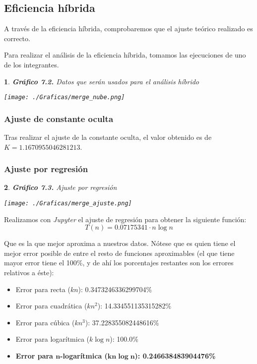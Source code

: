 \documentclass[10pt, a4paper]{article}
\theoremstyle{theorem-style}
\newtheorem*{datos}{}
\theoremstyle{theorem-style}
\theoremstyle{definition-style}
\theoremstyle{remark-style}
\theoremstyle{example-style}
\theoremstyle{definition-style}
\theoremstyle{remark-style}
\begin{document}
\subsection{Eficiencia híbrida}

A través de la eficiencia híbrida, comprobaremos que el ajuste teórico realizado es correcto.

Para realizar el análisis de la eficiencia híbrida, tomamos las ejecuciones de uno de los integrantes.
\pagebreak
\begin{datos}
	{\bf\sffamily Gráfico 7.2.} {\sffamily Datos que serán usados para el análisis híbrido}\\
	\vspace{-0.7cm}
	\begin{center}
		\texttt{[image: ./Graficas/merge\_nube.png]}
	\end{center}	
\end{datos}

\subsubsection{Ajuste de constante oculta}

Tras realizar el ajuste de la constante oculta, el valor obtenido es de $K=1.1670955046281213$.
\pagebreak
\subsubsection{Ajuste por regresión}

\begin{datos}
	{\bf\sffamily Gráfico 7.3.} {\sffamily Ajuste por regresión}\\
	\vspace{-0.7cm}
	\begin{center}
		\texttt{[image: ./Graficas/merge\_ajuste.png]}
	\end{center}	
\end{datos}

Realizamos con \emph{Jupyter} el ajuste de regresión para obtener la siguiente función:
$$T(n)=0.07175341\cdot n\log n$$

Que es la que mejor aproxima a nuestros datos. Nótese que es quien tiene el mejor error posible de entre el resto de funciones aproximables (el que tiene mayor error tiene el 100\%, y de ahí los porcentajes restantes son los errores relativos a éste):

\begin{itemize}
	\item Error para recta ($kn$): 0.3473246336299704\%
	\item Error para cuadrática ($kn^2$): 14.334551135315282\%
	\item Error para cúbica ($kn^3$): 37.228355082448616\%
	\item Error para logarítmica ($k\log n$): 100.0\%
	\item \textbf{Error para $\boldsymbol{n}$-logarítmica ($\boldsymbol{kn\log n}$): 0.246638483904476\%}
\end{itemize}
\pagebreak
\end{document}
